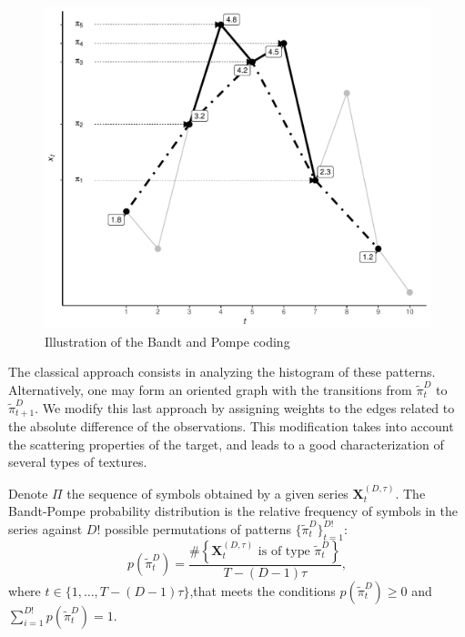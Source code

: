 \documentclass[journal]{IEEEtran}
\begin{document}
\begin{figure}[hbt]
	\centering
	\includegraphics[width=.9\linewidth]{Figures/IntroBP.pdf}
	\caption{Illustration of the Bandt and Pompe coding\label{Fig:IntroBP}}
\end{figure}

The classical approach consists in analyzing the histogram of these patterns.
Alternatively, one may form an oriented graph with the transitions from $\widetilde\pi_t^D$ to $\widetilde\pi_{t+1}^D$. 
We modify this last approach by assigning weights to the edges related to the absolute difference of the observations.
This modification takes into account the scattering properties of the target, and leads to a good characterization of several types of textures.

Denote $\Pi$ the sequence of symbols obtained by a given series $\mathbf{X}_t^{(D,\tau)}$.
The Bandt-Pompe probability distribution is the relative frequency of symbols in the series against $D!$ possible permutations of patterns $\{\widetilde\pi_t^D \}_{t = 1}^{D!}$:
%
\begin{equation}
   p(\widetilde\pi_t^D) = \frac{\#\left \{\mathbf{X}_t^{(D,\tau)} \text{ is of type } \widetilde\pi_t^D\right \}}{T- (D-1)\tau},  
\end{equation}
where  $t\in \{1, \dots, T-(D-1)\tau\}$,that meets the conditions $p(\widetilde\pi_t^D) \ge 0$ and  $\sum_{i=1}^{D!} p(\widetilde\pi_t^D) = 1$.
\end{document}
